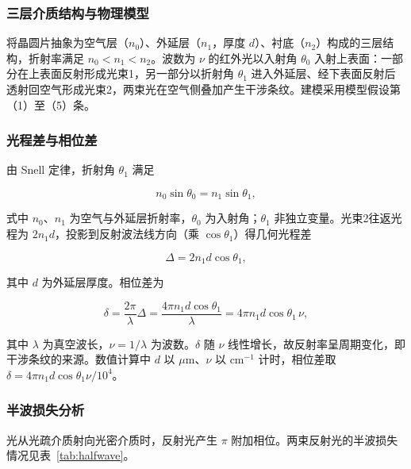\documentclass[withoutpreface,bwprint]{cumcmthesis}
\begin{document}
\subsubsection{三层介质结构与物理模型}

将晶圆片抽象为空气层（$n_0$）、外延层（$n_1$，厚度 $d$）、衬底（$n_2$）构成的三层结构，折射率满足 $n_0<n_1<n_2$。波数为 $\nu$ 的红外光以入射角 $\theta_0$ 入射上表面：一部分在上表面反射形成光束1，另一部分以折射角 $\theta_1$ 进入外延层、经下表面反射后透射回空气形成光束2，两束光在空气侧叠加产生干涉条纹。建模采用模型假设第（1）至（5）条。

\subsubsection{光程差与相位差}

由 Snell 定律，折射角 $\theta_1$ 满足

\begin{equation}
n_0\sin\theta_0 = n_1\sin\theta_1,
\label{eq:snell}
\end{equation}

式中 $n_0$、$n_1$ 为空气与外延层折射率，$\theta_0$ 为入射角；$\theta_1$ 非独立变量。光束2往返光程为 $2n_1d$，投影到反射波法线方向（乘 $\cos\theta_1$）得几何光程差

\begin{equation}
\Delta = 2n_1 d\cos\theta_1,
\label{eq:opd}
\end{equation}

其中 $d$ 为外延层厚度。相位差为

\begin{equation}
\delta = \frac{2\pi}{\lambda}\Delta
      = \frac{4\pi n_1 d\cos\theta_1}{\lambda}
      = 4\pi n_1 d\cos\theta_1\,\nu,
\label{eq:phase}
\end{equation}

其中 $\lambda$ 为真空波长，$\nu=1/\lambda$ 为波数。$\delta$ 随 $\nu$ 线性增长，故反射率呈周期变化，即干涉条纹的来源。数值计算中 $d$ 以 $\mu$m、$\nu$ 以 cm$^{-1}$ 计时，相位差取 $\delta=4\pi n_1 d\cos\theta_1\nu/10^{4}$。

\subsubsection{半波损失分析}

光从光疏介质射向光密介质时，反射光产生 $\pi$ 附加相位。两束反射光的半波损失情况见表~\ref{tab:halfwave}。
\end{document}
